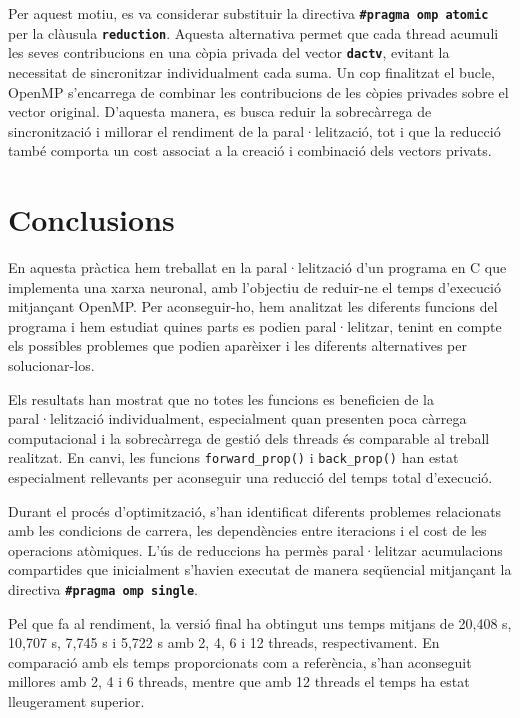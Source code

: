\documentclass{article}
\begin{document}
\bigskip

\noindent Per aquest motiu, es va considerar substituir la directiva \textbf{\texttt{\#pragma omp atomic}} per la clàusula \textbf{\texttt{reduction}}. Aquesta alternativa permet que cada thread acumuli les seves contribucions en una còpia privada del vector \textbf{\texttt{dactv}}, evitant la necessitat de sincronitzar individualment cada suma. Un cop finalitzat el bucle, OpenMP s'encarrega de combinar les contribucions de les còpies privades sobre el vector original. D'aquesta manera, es busca reduir la sobrecàrrega de sincronització i millorar el rendiment de la paral·lelització, tot i que la reducció també comporta un cost associat a la creació i combinació dels vectors privats.

\newpage
\section{Conclusions}

\noindent En aquesta pràctica hem treballat en la paral·lelització d'un programa en C que implementa una xarxa neuronal, amb l'objectiu de reduir-ne el temps d'execució mitjançant OpenMP. Per aconseguir-ho, hem analitzat les diferents funcions del programa i hem estudiat quines parts es podien paral·lelitzar, tenint en compte els possibles problemes que podien aparèixer i les diferents alternatives per solucionar-los.

\bigskip

\noindent Els resultats han mostrat que no totes les funcions es beneficien de la paral·lelització individualment, especialment quan presenten poca càrrega computacional i la sobrecàrrega de gestió dels threads és comparable al treball realitzat. En canvi, les funcions \texttt{forward\_prop()} i \texttt{back\_prop()} han estat especialment rellevants per aconseguir una reducció del temps total d'execució.

\bigskip

\noindent Durant el procés d'optimització, s'han identificat diferents problemes relacionats amb les condicions de carrera, les dependències entre iteracions i el cost de les operacions atòmiques. L'ús de reduccions ha permès paral·lelitzar acumulacions compartides que inicialment s'havien executat de manera seqüencial mitjançant la directiva \textbf{\texttt{\#pragma omp single}}.

\bigskip

\noindent Pel que fa al rendiment, la versió final ha obtingut uns temps mitjans de 20,408 s, 10,707 s, 7,745 s i 5,722 s amb 2, 4, 6 i 12 threads, respectivament. En comparació amb els temps proporcionats com a referència, s'han aconseguit millores amb 2, 4 i 6 threads, mentre que amb 12 threads el temps ha estat lleugerament superior.
\end{document}
